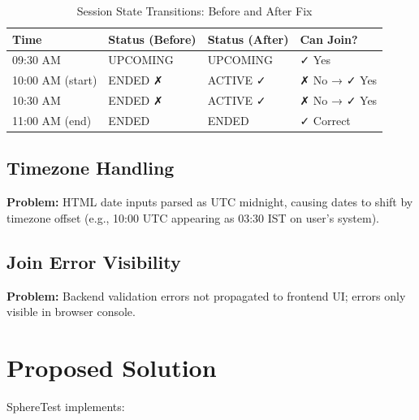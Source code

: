 \documentclass[12pt,a4paper]{report}
\newcommand{\rA}{\rowcolor{white}}
\newcommand{\rB}{\rowcolor{lightgray}}
\newcommand{\rH}{\rowcolor{headcol}}
\begin{document}
\begin{table}[H]
  \centering
  \small
  \begin{tabular}{|l|l|l|l|}
    \hline
    \rH \textbf{Time} & \textbf{Status (Before)} & \textbf{Status (After)} & \textbf{Can Join?} \\
    \hline
    \rA 09:30 AM & UPCOMING & UPCOMING & ✓ Yes \\
    \hline
    \rB 10:00 AM (start) & ENDED ✗ & ACTIVE ✓ & ✗ No → ✓ Yes \\
    \hline
    \rA 10:30 AM & ENDED ✗ & ACTIVE ✓ & ✗ No → ✓ Yes \\
    \hline
    \rB 11:00 AM (end) & ENDED & ENDED & ✓ Correct \\
    \hline
  \end{tabular}
  \caption{Session State Transitions: Before and After Fix}
  \label{tab:session_fix}
\end{table}

\subsection{Timezone Handling}

\textbf{Problem:} HTML date inputs parsed as UTC midnight, causing dates to shift by timezone offset (e.g., 10:00 UTC appearing as 03:30 IST on user's system).

\subsection{Join Error Visibility}

\textbf{Problem:} Backend validation errors not propagated to frontend UI; errors only visible in browser console.

\section{Proposed Solution}

SphereTest implements:
\end{document}
